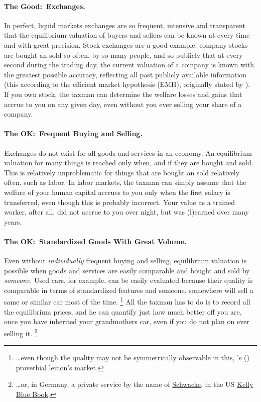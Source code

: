 \paragraph{The Good:~Exchanges.}
In perfect, liquid markets exchanges are so frequent, intensive and transparent that the equilibrium valuation of  buyers and sellers can be known at every time and with great precision.
Stock exchanges are a good example:
company stocks are bought an sold so often, by so many people, and so publicly that at every second during the trading day, the current valuation of a company is known with the greatest possible accuracy, reflecting all past publicly available information (this according to the efficient market hypothesis (EMH), originally stated by \citealt{Cowles1937}).
If you own stock, the taxman can determine the welfare losses and gains that accrue to you on any given day, even without you ever selling your share of a company.

\paragraph{The OK:~Frequent Buying and Selling.}
Exchanges do not exist for all goods and services in an economy.
An equilibrium valuation for many things is reached only when, and if they are bought and sold.
This is relatively unproblematic for things that are bought an sold relatively often, such as labor.
In labor markets, the taxman can simply assume that the welfare of your human capital accrues to you only when the first salary is transferred, even though this is probably incorrect.
Your value as a trained worker, after all, did not accrue to you over night, but was (l)earned over many years.

\paragraph{The OK:~Standardized Goods With Great Volume.}
Even without \emph{individually} frequent buying and selling, equilibrium valuation is possible when goods and services are easily comparable and bought and sold by \emph{someone}.
Used cars, for example, can be easily evaluated because their quality is comparable in terms of standardized features and someone, somewhere will sell a same or similar car most of the time.
\footnote{
	\ldots even though the quality may not be symmetrically observable in this, \citeauthor{Akerlof-1970-aa}'s (\citeyear{Akerlof-1970-aa}) proverbial lemon's market.
}
All the taxman has to do is to record all the equilibrium prices, and he can quantify just how much better off you are, once you have inherited your grandmothers car, even if you do not plan on ever selling it.
\footnote{
	\ldots or, in Germany, a private service by the name of \href{http://www.schwacke.de/}{Schwacke}, in the US \href{http://www.kbb.com/}{Kelly Blue Book}.
}

